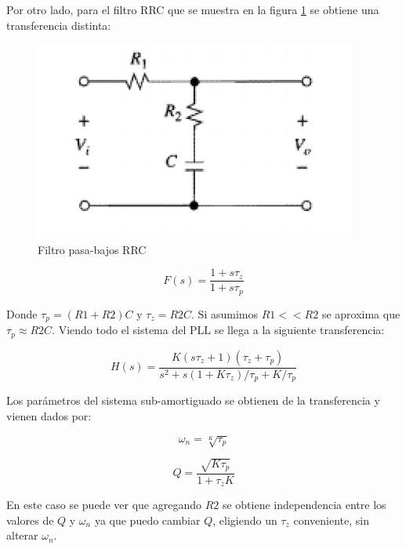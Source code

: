 \documentclass[10pt,a4paper]{article}
\begin{document}
Por otro lado, para el filtro RRC que se muestra en la figura \ref{fig:RRC} se obtiene una transferencia distinta:

\begin{figure}[hbtp]
	\centering
	\includegraphics[scale=1]{Imagenes/Filtro RRC.png}
	\caption{Filtro pasa-bajos RRC}
	\label{fig:RRC}
\end{figure}

\begin{equation}
	F(s)= \frac{1 + s \tau_z}{1 + s\tau_p}
	\label{eq:FRRC}
\end{equation}

Donde $\tau_p=(R1+R2)C $ y $\tau_z=R2C$. Si asumimos $R1<<R2$ se aproxima que $\tau_p \approx R2C$. Viendo todo el sistema del PLL se llega a la siguiente transferencia: 

\begin{equation}
	H(s) = \frac{K(s\tau_z +1)(\tau_z+\tau_p) }{ s^2 + s(1+K\tau_z)/\tau_p + K/\tau_p }
	\label{eq:TransRRC}
\end{equation}

Los parámetros del sistema sub-amortiguado se obtienen de la transferencia y vienen dados por:

\begin{equation}
	\omega_n = \sqrt[K]{\tau_p}
	\label{eq:omeganRRC}
\end{equation}

\begin{equation}
	Q = \frac{ \sqrt{K\tau_p} }{ 1 + \tau_z K }
	\label{eq:QRRC}
\end{equation}

En este caso se puede ver que agregando $R2$ se obtiene independencia entre los valores de $Q$ y $\omega_n$ ya que puedo cambiar $Q$, eligiendo un $\tau_z$ conveniente, sin alterar $\omega_n$.
\end{document}
